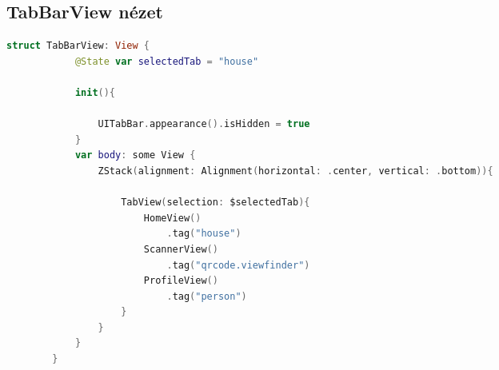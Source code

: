 \subsection*{TabBarView nézet}

\begin{spacing}{2}
\end{spacing}
\begin{minipage}{\textwidth}
    \linespread{0.8}\selectfont
    \begin{lstlisting}[language=swift]
        struct TabBarView: View {
            @State var selectedTab = "house"
            
            init(){
                
                UITabBar.appearance().isHidden = true
            }
            var body: some View {
                ZStack(alignment: Alignment(horizontal: .center, vertical: .bottom)){
                    
                    TabView(selection: $selectedTab){
                        HomeView()
                            .tag("house")
                        ScannerView()
                            .tag("qrcode.viewfinder")
                        ProfileView()
                            .tag("person")
                    }
                }
            }
        }

    \end{lstlisting}   
\end{minipage}

